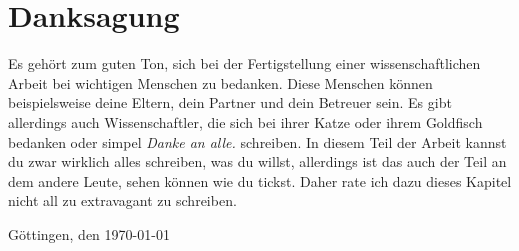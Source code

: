 

\section*{Danksagung}

Es gehört zum guten Ton, sich bei der Fertigstellung einer wissenschaftlichen Arbeit bei wichtigen Menschen zu bedanken. Diese Menschen können beispielsweise deine Eltern, dein Partner und dein Betreuer sein. Es gibt allerdings auch Wissenschaftler, die sich bei ihrer Katze oder ihrem Goldfisch bedanken oder simpel \textit{Danke an alle.} schreiben. In diesem Teil der Arbeit kannst du zwar wirklich alles schreiben, was du willst, allerdings ist das auch der Teil an dem andere Leute, sehen können wie du tickst. Daher rate ich dazu dieses Kapitel nicht all zu extravagant zu schreiben.
\vspace{3em}

Göttingen, den \today
